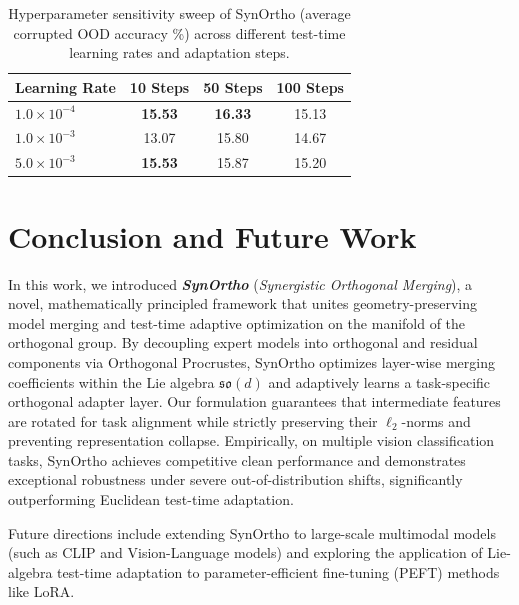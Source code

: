 \documentclass{article}
\theoremstyle{plain}
\theoremstyle{definition}
\theoremstyle{remark}
\begin{document}
\begin{table}[h]
\caption{Hyperparameter sensitivity sweep of SynOrtho (average corrupted OOD accuracy \%) across different test-time learning rates and adaptation steps.}
\label{tab:sensitivity_table}
\vskip 0.1in
\begin{center}
\begin{small}
\begin{sc}
\begin{tabular}{lccc}
\toprule
Learning Rate & 10 Steps & 50 Steps & 100 Steps \\
\midrule
$1.0 \times 10^{-4}$ & \textbf{15.53} & \textbf{16.33} & 15.13 \\
$1.0 \times 10^{-3}$ & 13.07 & 15.80 & 14.67 \\
$5.0 \times 10^{-3}$ & \textbf{15.53} & 15.87 & 15.20 \\
\bottomrule
\end{tabular}
\end{sc}
\end{small}
\end{center}
\vskip -0.1in
\end{table}

\section{Conclusion and Future Work}
\label{submission-conclusion}

In this work, we introduced \textbf{\textit{SynOrtho}} (\textit{Synergistic Orthogonal Merging}), a novel, mathematically principled framework that unites geometry-preserving model merging and test-time adaptive optimization on the manifold of the orthogonal group. By decoupling expert models into orthogonal and residual components via Orthogonal Procrustes, SynOrtho optimizes layer-wise merging coefficients within the Lie algebra $\mathfrak{so}(d)$ and adaptively learns a task-specific orthogonal adapter layer. Our formulation guarantees that intermediate features are rotated for task alignment while strictly preserving their $\ell_2$-norms and preventing representation collapse. Empirically, on multiple vision classification tasks, SynOrtho achieves competitive clean performance and demonstrates exceptional robustness under severe out-of-distribution shifts, significantly outperforming Euclidean test-time adaptation. 

Future directions include extending SynOrtho to large-scale multimodal models (such as CLIP and Vision-Language models) and exploring the application of Lie-algebra test-time adaptation to parameter-efficient fine-tuning (PEFT) methods like LoRA.
\end{document}
